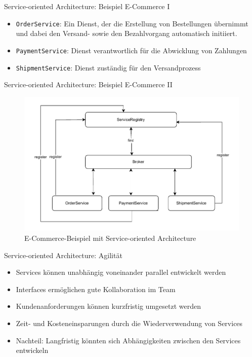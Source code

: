 \begin{frame}{Service-oriented Architecture: Beispiel E-Commerce I}
  \begin{itemize}
    \item \texttt{OrderService}: Ein Dienst, der die Erstellung von Bestellungen übernimmt und dabei den Versand- sowie den Bezahlvorgang automatisch initiiert.
    \item \texttt{PaymentService}: Dienst verantwortlich für die Abwicklung von Zahlungen
    \item \texttt{ShipmentService}: Dienst zuständig für den Versandprozess
  \end{itemize}
\end{frame}

\begin{frame}{Service-oriented Architecture: Beispiel E-Commerce II}
  \begin{figure}[!h]
    \centering
    \includegraphics[scale=0.5]{imglib/soa/soa-example.drawio}
    \caption{E-Commerce-Beispiel mit Service-oriented Architecture}
    \label{fig:soaecommerce}
  \end{figure}
\end{frame}

\begin{frame}{Service-oriented Architecture: Agilität}
  \begin{itemize}
    \item Services können unabhängig voneinander parallel entwickelt werden
    \item Interfaces ermöglichen gute Kollaboration im Team
    \item Kundenanforderungen können kurzfristig umgesetzt werden
    \item Zeit- und Kosteneinsparungen durch die Wiederverwendung von Services
    \item Nachteil: Langfristig könnten sich Abhängigkeiten zwischen den Services entwickeln
    \end{itemize}
\end{frame}
